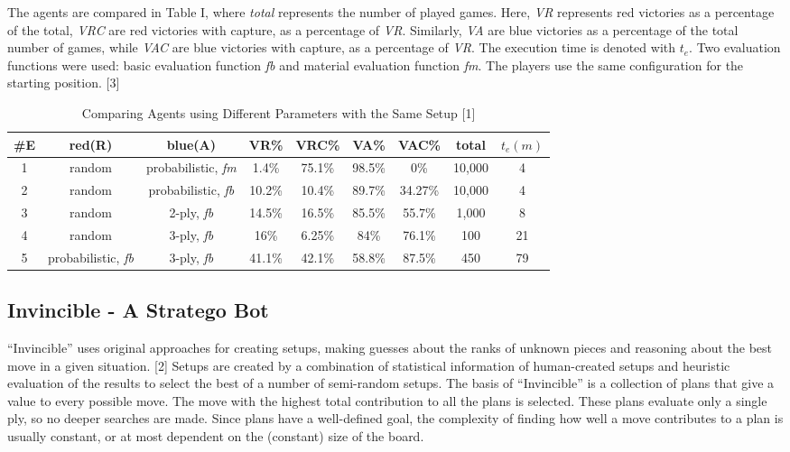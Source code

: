 \documentclass{article}
\begin{document}
The agents are compared in Table I, where \textit{total} represents the number of played games. 
Here, \textit{VR} represents red victories as a percentage of the total, \textit{VRC} are red victories with capture, as a percentage of \textit{VR}. 
Similarly, \textit{VA} are blue victories as a percentage of the total number of games, while \textit{VAC} are blue victories with capture, as a percentage of \textit{VR}. 
The execution time is denoted with \textit{$t_e$}. Two evaluation functions were used: basic evaluation function \textit{fb} and material evaluation function \textit{fm}. 
The players use the same configuration for the starting position. [3] 

\begin{table}
  \caption{Comparing Agents using Different Parameters with the Same Setup [1]}
  \label{multi-agent-results}
  \centering
  \begin{tabular}{ccccccccc}
  \#E     &red(R) & blue(A) & VR\% & VRC\% & VA\% & VAC\% & total & $t_e(m)$  \\
  \toprule
    1			& random	& probabilistic, \textit{fm}	& 1.4\%	              & 75.1\%  & 98.5\% & 0\%      & 10,000  & 4\\
    2	    & random	& probabilistic, \textit{fb}	& 10.2\%	            & 10.4\%  & 89.7\% & 34.27\%  & 10,000  & 4\\
    3     & random	& 2-ply, \textit{fb}	        & 14.5\%	            & 16.5\%  & 85.5\% & 55.7\%   & 1,000   & 8\\
    4			& random	& 3-ply, \textit{fb}	        & 16\%	              & 6.25\%  & 84\%   & 76.1\%   & 100     & 21\\
    5			& probabilistic, \textit{fb}	& 3-ply, \textit{fb}	& 41.1\%	&42.1\%   & 58.8\% & 87.5\%   & 450     & 79\\
    \bottomrule
  \end{tabular}
\end{table}

\subsection{Invincible - A Stratego Bot}

“Invincible” uses original approaches for creating setups, making guesses about the ranks of unknown pieces and reasoning about the best move in a given situation. [2] 
Setups are created by a combination of statistical information of human-created setups and heuristic evaluation of the results to select the best of a number of semi-random setups. 
The basis of “Invincible” is a collection of plans that give a value to every possible move. The move with the highest total contribution to all the plans is selected. 
These plans evaluate only a single ply, so no deeper searches are made. 
Since plans have a well-defined goal, the complexity of finding how well a move contributes to a plan is usually constant, or at most dependent on the (constant) size of the board. 
\end{document}
